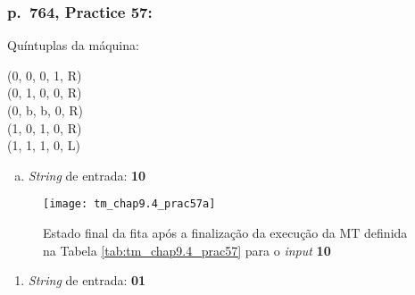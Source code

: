 \subsubsection*{p.\ 764, Practice 57:}

\begin{table}[H]
    \begin{minipage}{.5\linewidth}
        \begin{flushright}
            Quíntuplas da máquina:\hspace*{1ex}    %
        \end{flushright}
    \end{minipage}%
    \begin{minipage}{.5\linewidth}
            \ttfamily
            \hspace*{1ex}(0, 0, 0, 1, R) \\        %
            \hspace*{1ex}(0, 1, 0, 0, R) \\        %
            \hspace*{1ex}(0, b, b, 0, R) \\        %
            \hspace*{1ex}(1, 0, 1, 0, R) \\        %
            \hspace*{1ex}(1, 1, 1, 0, L)           %
    \end{minipage}

    \caption{\cite[p.\ 764, Practice 57]{judith}}
    \label{tab:tm_chap9.4_prac57}
\end{table}

\begin{enumerate}[a.]
    \item \textit{String} de entrada: \textbf{10}
\end{enumerate}

\begin{figure}[H]
    \centering
    \texttt{[image: tm\_chap9.4\_prac57a]}
    \caption{
        Estado final da fita após a finalização da execução da MT definida na
        Tabela \ref{tab:tm_chap9.4_prac57} para o \textit{input} \textbf{10}
    }
    \label{fig:tm_chap9.4_prac57a}
\end{figure}

\begin{enumerate}[resume*]
    \item \textit{String} de entrada: \textbf{01}
\end{enumerate}

